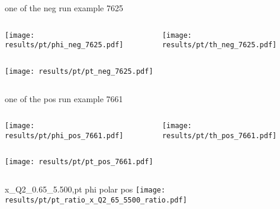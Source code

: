 \begin{frame}{one of the neg run example 7625}
\begin{columns}
\begin{column}[T]{0.5\textwidth}
\texttt{[image: results/pt/phi\_neg\_7625.pdf]}
\end{column}
\begin{column}[T]{0.5\textwidth}
\texttt{[image: results/pt/th\_neg\_7625.pdf]}
\end{column}
\end{columns}
\begin{columns}
\begin{column}[T]{0.5\textwidth}
\texttt{[image: results/pt/pt\_neg\_7625.pdf]}
\end{column}
\begin{column}[T]{0.5\textwidth}
\end{column}
\end{columns}
\end{frame}
\begin{frame}{one of the pos run example 7661}
\begin{columns}
\begin{column}[T]{0.5\textwidth}
\texttt{[image: results/pt/phi\_pos\_7661.pdf]}
\end{column}
\begin{column}[T]{0.5\textwidth}
\texttt{[image: results/pt/th\_pos\_7661.pdf]}
\end{column}
\end{columns}
\begin{columns}
\begin{column}[T]{0.5\textwidth}
\texttt{[image: results/pt/pt\_pos\_7661.pdf]}
\end{column}
\begin{column}[T]{0.5\textwidth}
\end{column}
\end{columns}
\end{frame}
\begin{frame}{x\_Q2\_0.65\_5.500,pt phi polar pos}
\texttt{[image: results/pt/pt\_ratio\_x\_Q2\_65\_5500\_ratio.pdf]}
\end{frame}
